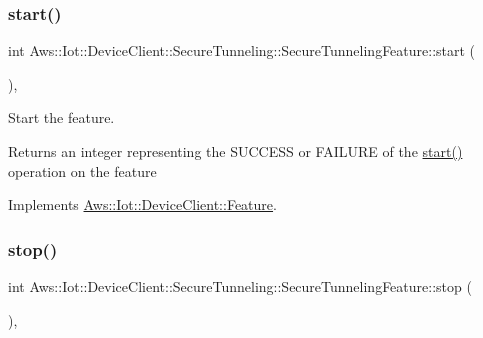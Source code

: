 \subsubsection{\texorpdfstring{start()}{start()}}
{\footnotesize\ttfamily int Aws\+::\+Iot\+::\+Device\+Client\+::\+Secure\+Tunneling\+::\+Secure\+Tunneling\+Feature\+::start (\begin{DoxyParamCaption}{ }\end{DoxyParamCaption})\hspace{0.3cm}{\ttfamily [override]}, {\ttfamily [virtual]}}



Start the feature. 

\begin{DoxyReturn}{Returns}
an integer representing the S\+U\+C\+C\+E\+SS or F\+A\+I\+L\+U\+RE of the \hyperlink{class_aws_1_1_iot_1_1_device_client_1_1_secure_tunneling_1_1_secure_tunneling_feature_a9e33fc786883e519e587f7d89f2a9086}{start()} operation on the feature 
\end{DoxyReturn}


Implements \hyperlink{class_aws_1_1_iot_1_1_device_client_1_1_feature_ac9a936ebd88f7e35914a6aac99badf7d}{Aws\+::\+Iot\+::\+Device\+Client\+::\+Feature}.

\mbox{\label{class_aws_1_1_iot_1_1_device_client_1_1_secure_tunneling_1_1_secure_tunneling_feature_a9cd3840b50bd1f62537df3354c7d2fbf}} 
\subsubsection{\texorpdfstring{stop()}{stop()}}
{\footnotesize\ttfamily int Aws\+::\+Iot\+::\+Device\+Client\+::\+Secure\+Tunneling\+::\+Secure\+Tunneling\+Feature\+::stop (\begin{DoxyParamCaption}{ }\end{DoxyParamCaption})\hspace{0.3cm}{\ttfamily [override]}, {\ttfamily [virtual]}}



